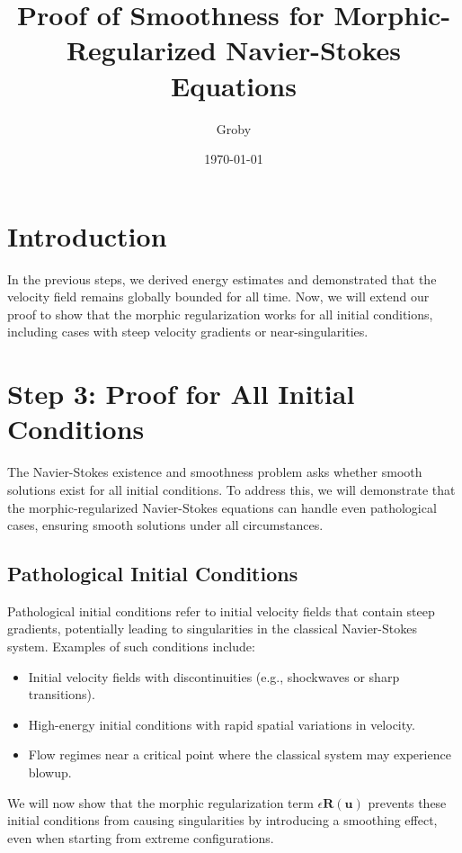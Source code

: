 \documentclass{article}
\title{Proof of Smoothness for Morphic-Regularized Navier-Stokes Equations}
\author{Groby}
\date{\today}
\begin{document}
\maketitle

\section*{Introduction}

In the previous steps, we derived energy estimates and demonstrated that the velocity field remains globally bounded for all time. Now, we will extend our proof to show that the morphic regularization works for all initial conditions, including cases with steep velocity gradients or near-singularities.

\section{Step 3: Proof for All Initial Conditions}

The Navier-Stokes existence and smoothness problem asks whether smooth solutions exist for all initial conditions. To address this, we will demonstrate that the morphic-regularized Navier-Stokes equations can handle even pathological cases, ensuring smooth solutions under all circumstances.

\subsection*{Pathological Initial Conditions}

Pathological initial conditions refer to initial velocity fields that contain steep gradients, potentially leading to singularities in the classical Navier-Stokes system. Examples of such conditions include:
\begin{itemize}
    \item Initial velocity fields with discontinuities (e.g., shockwaves or sharp transitions).
    \item High-energy initial conditions with rapid spatial variations in velocity.
    \item Flow regimes near a critical point where the classical system may experience blowup.
\end{itemize}

We will now show that the morphic regularization term \( \epsilon \mathbf{R}(\mathbf{u}) \) prevents these initial conditions from causing singularities by introducing a smoothing effect, even when starting from extreme configurations.
\end{document}
